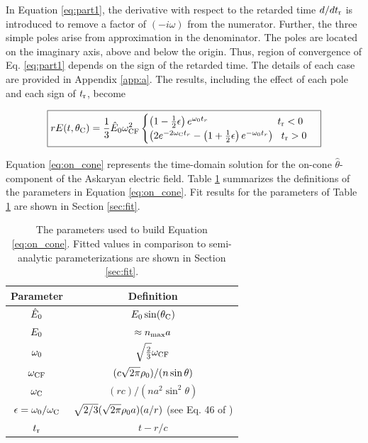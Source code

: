 \documentclass[amsmath,amssymb,aps,prd,10pt,twocolumn]{revtex4}
\begin{document}
In Equation \ref{eq:part1}, the derivative with respect to the retarded time $d/dt_{\rm r}$ is introduced to remove a factor of $(-i\omega)$ from the numerator.  Further, the three simple poles arise from approximation in the denominator.  The poles are located on the imaginary axis, above and below the origin.  Thus, region of convergence of Eq. \ref{eq:part1} depends on the sign of the retarded time.  The details of each case are provided in Appendix \ref{app:a}.  The results, including the effect of each pole and each sign of $t_{\rm r}$, become

\begin{widetext}
\begin{equation}
\boxed{
r E(t,\theta_{\rm C}) = \frac{1}{3} \hat{E}_0 \omega_{\rm CF}^2
\begin{cases}
\left(1 - \frac{1}{2}\epsilon \right)e^{\omega_{\rm 0} t_r} ~~~~~~~~~~~~~~~~~~~~~ t_{\rm r} < 0 \\
\left( 2 e^{-2\omega_{\rm C} t_r} - \left(1+\frac{1}{2}\epsilon \right) e^{-\omega_{\rm 0}t_r} \right) ~~ t_{\rm r} > 0
\end{cases}
} \label{eq:on_cone}
\end{equation}
\end{widetext}

Equation \ref{eq:on_cone} represents the time-domain solution for the on-cone $\hat{\theta}$-component of the Askaryan electric field.  Table \ref{tab:features_1} summarizes the definitions of the parameters in Equation \ref{eq:on_cone}.  Fit results for the parameters of Table \ref{tab:features_1} are shown in Section \ref{sec:fit}.

\begin{table}
\renewcommand{\arraystretch}{1.5}
\begin{tabular}{| c | c |}
\hline
Parameter & Definition \\ \hline
$\hat{E}_{\rm 0}$ & $E_{\rm 0} \sin(\theta_{\rm C})$ \\
$E_{\rm 0}$ & $\approx n_{\rm max}a$ \\
$\omega_{\rm 0}$ & $\sqrt{\frac{2}{3}} \omega_{\rm CF}$ \\
$\omega_{\rm CF}$ & $(c\sqrt{2\pi}\rho_{\rm 0})/(n\sin\theta)$ \\
$\omega_{\rm C}$ & $(rc)/(na^2\sin^2\theta)$ \\
$\epsilon = \omega_{\rm 0}/\omega_{\rm C}$ & $\sqrt{2/3} (\sqrt{2\pi} \rho_{\rm 0} a) (a/r) $ (see Eq. 46 of \cite{10.1016/j.astropartphys.2017.03.008}) \\
$t_{\rm r}$ & $t - r/c$ \\ \hline
\end{tabular}
\caption{\label{tab:features_1} The parameters used to build Equation \ref{eq:on_cone}.  Fitted values in comparison to semi-analytic parameterizations are shown in Section \ref{sec:fit}.}
\end{table} 
\end{document}
